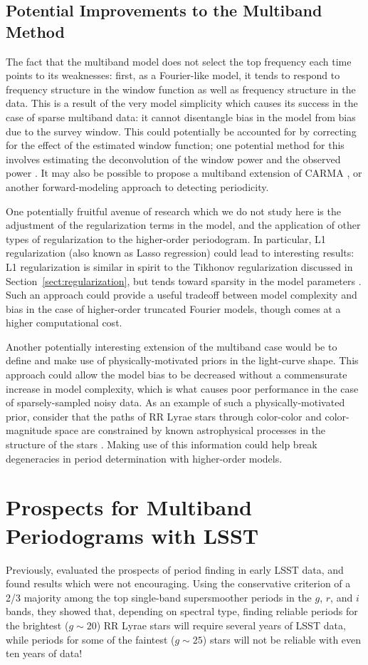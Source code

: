 \documentclass{emulateapj}
\newcommand{\Sect}[1]{Section~\ref{sect:#1}}
\newcommand{\sect}[1]{\Sect{#1}}
\newcommand{\sectlabel}[1]{\label{sect:#1}}
\begin{document}
\subsection{Potential Improvements to the Multiband Method}
The fact that the multiband model does not select the top frequency each time points to its weaknesses: first, as a Fourier-like model, it tends to respond to frequency structure in the window function as well as frequency structure in the data.
This is a result of the very model simplicity which causes its success in the case of sparse multiband data: it cannot disentangle bias in the model from bias due to the survey window.
This could potentially be accounted for by correcting for the effect of the estimated window function; one potential method for this involves estimating the deconvolution of the window power and the observed power \citep{Roberts87}.
It may also be possible to propose a multiband extension of CARMA \citep{Kelly14}, or another forward-modeling approach to detecting periodicity.

One potentially fruitful avenue of research which we do not study here is the adjustment of the regularization terms in the model, and the application of other types of regularization to the higher-order periodogram.
In particular, L1 regularization (also known as Lasso regression) could lead to interesting results: L1 regularization is similar in spirit to the Tikhonov regularization discussed in \sect{regularization}, but tends toward sparsity in the model parameters \citep[see, e.g.][for a discussion]{ICVG2014}.
Such an approach could provide a useful tradeoff between model complexity and bias in the case of higher-order truncated Fourier models, though comes at a higher computational cost.

Another potentially interesting extension of the multiband case would be to define and make use of physically-motivated priors in the light-curve shape.
This approach could allow the model bias to be decreased without a commensurate increase in model complexity, which is what causes poor performance in the case of sparsely-sampled noisy data.
As an example of such a physically-motivated prior, consider that the paths of RR Lyrae stars through color-color and color-magnitude space are constrained by known astrophysical processes in the structure of the stars \citep[e.g., see Fig. 5 in][]{Szabo2014}. Making use of this information could help break degeneracies in period determination with higher-order models.

\section{Prospects for Multiband Periodograms with LSST}
\sectlabel{LSST}
Previously, \citet{Oluseyi12} evaluated the prospects of period finding in early LSST data, and found results which were not encouraging.
Using the conservative criterion of a 2/3 majority among the top single-band supersmoother periods in the $g$, $r$, and $i$ bands, they showed that, depending on spectral type, finding reliable periods for the brightest ($g \sim 20$) RR Lyrae stars will require several years of LSST data, while periods for some of the faintest ($g \sim 25$) stars will not be reliable with even ten years of data!
\end{document}
